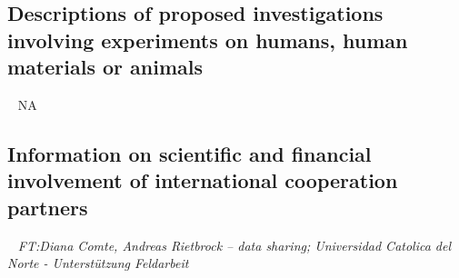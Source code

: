 \documentclass[11pt]{article}
\providecommand{\currfilename}{}
\newcommand{\showfile}{{\bf \tt \color{blue} \currfilename}}
\newcommand{\note}[1]{{\it \color{red} #1}}
\newcommand{\noteft}[1]{{\it \color{magenta} FT:#1}}
\newcommand{\note}[1]{}
\newcommand{\noteft}[1]{}
\newcommand{\showfile}{}
\begin{document}


\subsection{Descriptions of proposed investigations involving experiments on humans, human materials or animals}
\showfile
NA

\subsection{Information on scientific and financial involvement of international cooperation partners}
\showfile
\noteft{Diana Comte, Andreas Rietbrock -- data sharing; Universidad Catolica del Norte - Unterstützung Feldarbeit}


\end{document}
